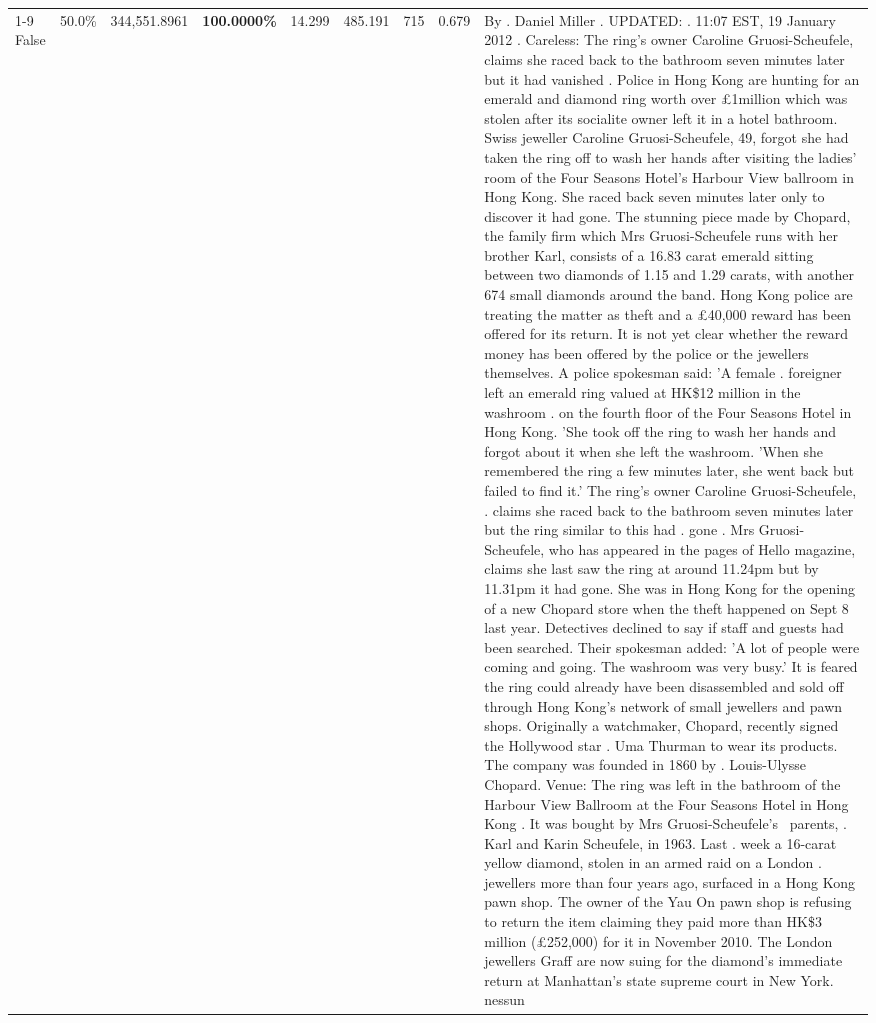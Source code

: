 \begin{table}[H]
\begin{tabular}{lllrlllll}
\cline{1-9}
False & 50.0\% & 344,551.8961 & \bfseries \color{red} 100.0000\% & 14.299 & 485.191 & 715 & 0.679 & By . Daniel Miller . UPDATED: . 11:07 EST, 19 January 2012 . Careless: The ring's owner Caroline Gruosi-Scheufele, claims she raced back to the bathroom seven minutes later but it had vanished . Police in Hong Kong are hunting for an emerald and diamond ring worth over £1million which was stolen after its socialite owner left it in a hotel bathroom. Swiss jeweller Caroline Gruosi-Scheufele, 49, forgot she had taken the ring off to wash her hands after visiting the ladies' room of the Four Seasons Hotel's Harbour View ballroom in Hong Kong. She raced back seven minutes later only to discover it had gone. The stunning piece made by Chopard, the family firm which Mrs Gruosi-Scheufele runs with her brother Karl, consists of a 16.83 carat emerald sitting between two diamonds of 1.15 and 1.29 carats, with another 674 small diamonds around the band. Hong Kong police are treating the matter as theft and a £40,000 reward has been offered for its return. It is not yet clear whether the reward money has been offered by the police or the jewellers themselves. A police spokesman said: 'A female . foreigner left an emerald ring valued at HK\$12 million in the washroom . on the fourth floor of the Four Seasons Hotel in Hong Kong. 'She took off the ring to wash her hands and forgot about it when she left the washroom. 'When she remembered the ring a few minutes later, she went back but failed to find it.' The ring's owner Caroline Gruosi-Scheufele, . claims she raced back to the bathroom seven minutes later but the ring similar to this had . gone . Mrs Gruosi-Scheufele, who has appeared in the pages of Hello magazine, claims she last saw the ring at around 11.24pm but by 11.31pm it had gone. She was in Hong Kong for the opening of a new Chopard store when the theft happened on Sept 8 last year. Detectives declined to say if staff and guests had been searched. Their spokesman added: 'A lot of people were coming and going. The washroom was very busy.' It is feared the ring could already have been disassembled and sold off through Hong Kong's network of small jewellers and pawn shops. Originally a watchmaker, Chopard, recently signed the Hollywood star . Uma Thurman to wear its products. The company was founded in 1860 by . Louis-Ulysse Chopard. Venue: The ring was left in the bathroom of the Harbour View Ballroom at the Four Seasons Hotel in Hong Kong . It was bought by Mrs Gruosi-Scheufele's  parents, . Karl and Karin Scheufele, in 1963. Last . week a 16-carat yellow diamond, stolen in an armed raid on a London . jewellers more than four years ago, surfaced in a Hong Kong pawn shop. The owner of the Yau On pawn shop is refusing to return the item claiming they paid more than HK\$3 million (£252,000) for it in November 2010. The London jewellers Graff are now suing for the diamond’s immediate return at Manhattan’s state supreme court in New York. nessun \\

\end{tabular}
\end{table}
